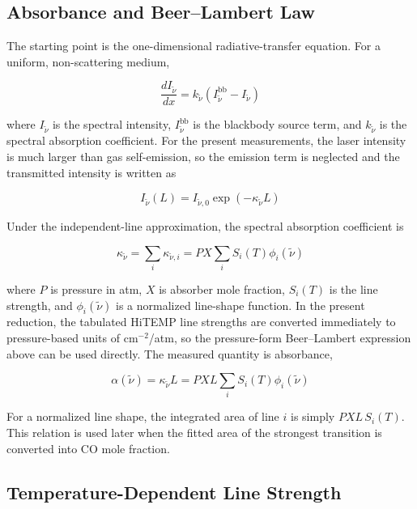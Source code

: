 \documentclass[12pt,letterpaper]{article}
\begin{document}
\subsection*{Absorbance and Beer--Lambert Law}
The starting point is the one-dimensional radiative-transfer equation. For a uniform, non-scattering medium,

\begin{equation}
  \frac{dI_{\tilde{\nu}}}{dx}
  =
  k_{\tilde{\nu}}\left(I_{\tilde{\nu}}^{\mathrm{bb}}-I_{\tilde{\nu}}\right)
\end{equation}

where $I_{\tilde{\nu}}$ is the spectral intensity, $I_{\tilde{\nu}}^{\mathrm{bb}}$ is the blackbody source term, and $k_{\tilde{\nu}}$ is the spectral absorption coefficient. For the present measurements, the laser intensity is much larger than gas self-emission, so the emission term is neglected and the transmitted intensity is written as

\begin{equation}
  I_{\tilde{\nu}}(L)
  =
  I_{\tilde{\nu},0}\exp(-\kappa_{\tilde{\nu}}L)
\end{equation}

Under the independent-line approximation, the spectral absorption coefficient is

\begin{equation}
  \kappa_{\tilde{\nu}}
  =
  \sum_i \kappa_{\tilde{\nu},i}
  =
  PX\sum_i S_i(T)\phi_i(\tilde{\nu})
\end{equation}

where $P$ is pressure in atm, $X$ is absorber mole fraction, $S_i(T)$ is the line strength, and $\phi_i(\tilde{\nu})$ is a normalized line-shape function. In the present reduction, the tabulated HiTEMP line strengths are converted immediately to pressure-based units of cm$^{-2}$/atm, so the pressure-form Beer--Lambert expression above can be used directly. The measured quantity is absorbance,

\begin{equation}
  \alpha(\tilde{\nu})
  =
  \kappa_{\tilde{\nu}}L
  =
  PXL\sum_i S_i(T)\phi_i(\tilde{\nu})
\end{equation}

For a normalized line shape, the integrated area of line $i$ is simply $PXL\,S_i(T)$. This relation is used later when the fitted area of the strongest transition is converted into CO mole fraction.

\subsection*{Temperature-Dependent Line Strength}
\end{document}

